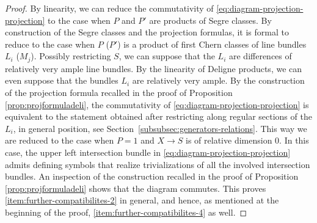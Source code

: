 \documentclass[JEP,XML,SOM,Unicode,published]{cedram}
\theoremstyle{plain}
\theoremstyle{definition}
\begin{document}
\begin{proof}
By linearity, we can reduce the commutativity of \eqref{eq:diagram-projection-projection} to the case when $P$ and $P'$ are products of Segre classes. By construction of the Segre classes and the projection formulas, it is formal to reduce to the case when $P$ (\resp $P'$) is a product of first Chern classes of line bundles $L_i$ (\resp $M_j$). Possibly restricting $S$, we can suppose that the $L_{i}$ are differences of relatively very ample line bundles. By the linearity of Deligne products, we can even suppose that the bundles $L_i$ are relatively very ample. By the construction of the projection formula recalled in the proof of Proposition \ref{prop:projformuladeli}, the commutativity of \eqref{eq:diagram-projection-projection} is equivalent to the statement obtained after restricting along regular sections of the $L_i$, in general position, see Section~\ref{subsubsec:generators-relations}. This way we are reduced to the case when $P=1$ and $X \to S$ is of relative dimension 0. In this case, the upper left intersection bundle in \eqref{eq:diagram-projection-projection} admits defining symbols that realize trivializations of all the involved intersection bundles. An inspection of the construction recalled in the proof of Proposition \ref{prop:projformuladeli} shows that the diagram commutes. This proves \eqref{item:further-compatibilites-2} in general, and hence, as mentioned at the beginning of the proof, \eqref{item:further-compatibilites-4} as well.


\end{proof}
\end{document}
